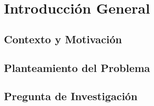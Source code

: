 
\chapter{Introducción General}

\section{Contexto y Motivación}

\section{Planteamiento del Problema}

\section{Pregunta de Investigación}

